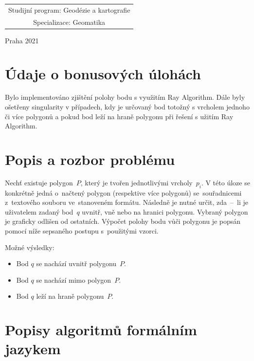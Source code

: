 \documentclass[a4paper, 12pt, oneside, titlepage]{article} %
\begin{document}
\begin{center}
\begin{tabular}{c}
Studijní program: Geodézie a kartografie \\
\noalign{\vspace{2mm}}

Specializace: Geomatika\\

\end{tabular}


\vfill

Praha 2021

\end{center}



\clearpage
\section*{Údaje o bonusových úlohách}
Bylo implementováno zjištění polohy bodu s využitím Ray Algorithm. Dále byly ošetřeny singularity v případech, kdy je určovaný bod totožný s vrcholem jednoho či více polygonů a pokud bod leží na hraně polygonu při řešení s užitím Ray Algorithm. 


\section*{Popis a rozbor problému}
Nechť existuje polygon~$P$, který je tvořen jednotlivými vrcholy~$p_i$. V této úloze se konkrétně jedná o~načtený polygon (respektive více polygonů) se~souřadnicemi z~textového souboru ve~stanoveném formátu. Následně je nutné určit, zda~--~li je uživatelem zadaný bod~$q$ uvnitř, vně nebo na hranici polygonu. Vybraný polygon je graficky odlišen od ostatních. Výpočet polohy bodu vůči polygonu je popsán pomocí níže sepsaného postupu s~použitými vzorci.

Možné výsledky:
\begin{itemize}
\item Bod $q$ se nachází uvnitř polygonu~$P$.
\item Bod $q$ se nachází mimo polygon~$P$.
\item Bod $q$ leží na hraně polygonu~$P$.
\end{itemize}


\section*{Popisy algoritmů formálním jazykem}
\end{document}
